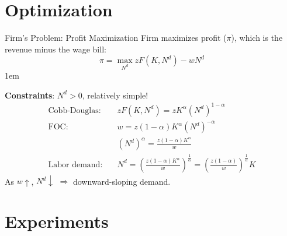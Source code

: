 \documentclass[11pt,aspectratio=43]{beamer}
\let\olditemize=\itemize
\let\endolditemize=\enditemize
\renewenvironment{itemize}{\olditemize \itemsep1em}{\endolditemize}
\theoremstyle{definition}
\begin{document}
\section{Optimization}
\label{sec:Optimization}

\begin{frame}{Firm's Problem: Profit Maximization}
\label{slide:Firm_s_Problem__Profit_Maximization}
Firm maximizes profit ($\pi$), which is the revenue minus the wage bill:
\begin{equation}
\label{eq:profit}
    \pi = \max_{N^{d}} z F( K, N^{d} ) - w N^{d}
\end{equation}
\begin{itemize}
    \item \textbf{Constraints}: $ N^{d} > 0 $, relatively simple!
        \begin{align}
            \text{Cobb-Douglas:} \quad
                & z F( K, N^{d} ) = z K^{\alpha} ( N^{d} )^{1-\alpha}
            \\
            \text{FOC:} \quad
                & w = z ( 1-\alpha ) K^{\alpha} ( N^{d} )^{-\alpha}
            \\
                & ( N^{d} )^{\alpha} = \frac{z ( 1-\alpha ) K^{\alpha}}{w}
            \\
            \text{Labor demand:} \quad
                & N^{d} = \left(
                    \frac{z ( 1-\alpha ) K^{\alpha}}{w}
                \right)^{\frac{1}{\alpha}}
                =
                \left(
                    \frac{z ( 1-\alpha ) }{w}
                \right)^{\frac{1}{\alpha}} K
        \end{align}
        As $ w \uparrow  $, $ N^{d} \downarrow  $ $ \Rightarrow  $ \alert{downward-sloping} demand.
\end{itemize}
\end{frame}

\section{Experiments}
\label{sec:Experiments}
\end{document}
